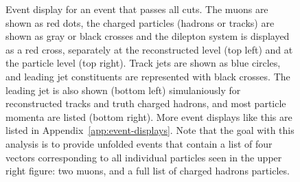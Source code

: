 \begin{figure}[h!]
  \caption{Event display for an event that passes all cuts. 
    The muons are shown as red dots, the charged particles (hadrons or tracks) are shown as gray or black crosses and the dilepton system is displayed as a red cross, separately at the reconstructed level (top left) and at the particle level (top right). 
    Track jets are shown as blue circles, and leading jet constituents are represented with black crosses.
    The leading jet is also shown (bottom left) simulaniously for reconstructed tracks and truth charged hadrons, and most particle momenta are listed (bottom right).
    More event displays like this are listed in Appendix~\ref{app:event-displays}. 
    Note that the goal with this analysis is to provide unfolded events that contain a list of four vectors corresponding to all individual particles seen in the upper right figure: two muons, and a full list of charged hadrons particles.}
  \label{fig:event-display-1}
\end{figure}
